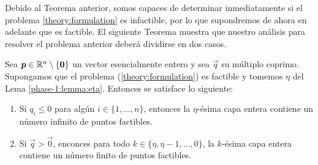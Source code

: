 Debido al Teorema anterior, somos capaces de determinar inmediatamente si el problema
\eqref{theory:formulation} es infactible, por lo que supondremos de ahora en adelante que es
factible. El siguiente Teorema muestra que nuestro análisis para resolver el problema anterior
deberá dividirse en dos casos.
\begin{theorem}
	\label{theory:th:feasibility}
	Sea $\boldsymbol{p} \in \mathbb{R}^n \setminus \lbrace \boldsymbol{0} \rbrace $ un vector esencialmente entero y sea
	$\vec{q}$ su múltiplo coprimo. Supongamos que el problema (\ref{theory:formulation}) es factible
	y tomemos $\eta$ del Lema \ref{phase-1:lemma:eta}. Entonces se satisface lo siguiente:
	\begin{enumerate}
		\item Si $q_i \leq 0$ para algún $i \in \lbrace 1, \ldots, n \rbrace$, entonces la $\eta$-ésima
			capa entera contiene un número infinito de puntos factibles.
		\item Si $\vec{q} > \vec{0}$, enconces para todo $k \in \lbrace \eta, \eta - 1, \ldots, 0
			\rbrace$, la $k$-ésima capa entera contiene un número finito de puntos factibles.
	\end{enumerate}
\end{theorem}
